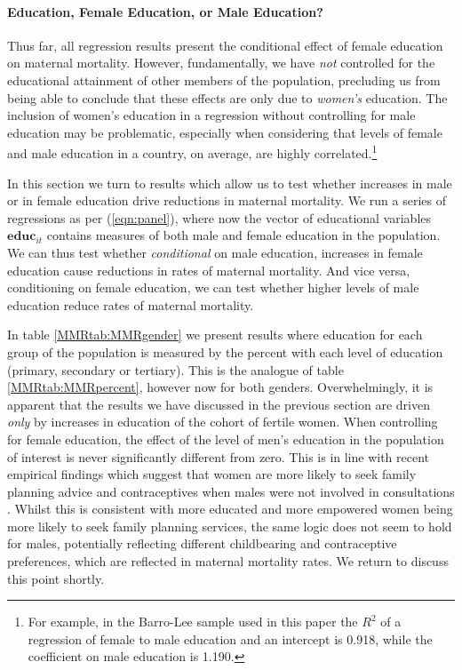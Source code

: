 \documentclass{article}[12pt,subeqn]
\begin{document}
\begin{spacing}{1.4}
\paragraph{Education, Female Education, or Male Education?}
\label{ssscn:gender}
Thus far, all regression results present the conditional effect of female 
education on maternal mortality.  However, fundamentally, we have \emph{not} 
controlled for the educational attainment of other members of the population, 
precluding us from being able to conclude that these effects are only due to 
\emph{women's} education.  The inclusion of women's education in a regression 
without controlling for male education may be problematic, especially when 
considering that levels of female and male education in a country, on average, 
are highly correlated.\footnote{For example, in the Barro-Lee sample used in this 
paper the $R^2$ of a regression of female to male education and an intercept is 
0.918, while the coefficient on male education is 1.190.}

In this section we turn to results which allow us to test whether increases 
in male or in female education drive reductions in maternal mortality.  We
run a series of regressions as per (\ref{eqn:panel}), where now the vector
of educational variables $\mathbf{educ}_{it}$ contains measures of both male
and female education in the population.  We can thus test whether 
\emph{conditional} on male education, increases in female education cause
reductions in rates of maternal mortality.  And vice versa, conditioning on
female education, we can test whether higher levels of male education reduce
rates of maternal mortality.

In table \ref{MMRtab:MMRgender} we present results where education for each 
group of the population is measured by the percent with each level of 
education (primary, secondary or tertiary).  This is the analogue of table
\ref{MMRtab:MMRpercent}, however now for both genders.  Overwhelmingly, it is
apparent that the results we have discussed in the previous section are driven
\emph{only} by increases in education of the cohort of fertile women.  When
controlling for female education, the effect of the level of men's education in
the population of interest is never significantly different from
zero.  This is in line with recent empirical findings which suggest
that women are more likely to seek family planning advice and
contraceptives when males were not involved in consultations
\citet{Ashrafetal2014}.  Whilst this is consistent with more educated
and more empowered women being more likely to seek family planning
services, the same logic does not seem to hold for males, potentially
reflecting different childbearing and contraceptive preferences,
which are reflected in maternal mortality rates.  We return to discuss this
point shortly.


\end{spacing}
\end{document}
